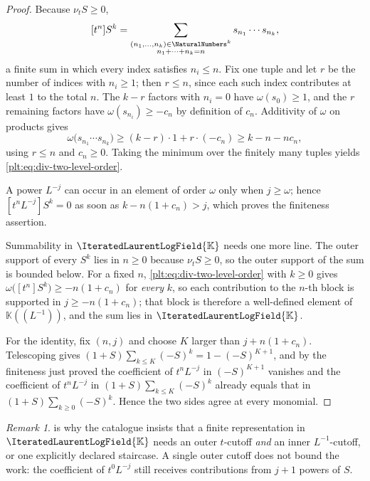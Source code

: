 \documentclass[11pt,oneside]{article}
\theoremstyle{plain}
\theoremstyle{definition}
\theoremstyle{remark}
\newtheorem{remark}[theorem]{Remark}
\newcommand{\K}{\mathbb{K}}
\newcommand{\PLit}{\IteratedLaurentLogField{\K}}         %
\newcommand{\ordt}{\nu_{t}}                              %
\begin{document}
\begin{proof}
Because \(\ordt S\ge0\),
\[
  [t^{n}]S^{k}=\sum_{\substack{(n_{1},\dots,n_{k})\in\NaturalNumbers^{k}\\
                               n_{1}+\cdots+n_{k}=n}}
    s_{n_{1}}\cdots s_{n_{k}},
\]
a finite sum in which every index satisfies \(n_{i}\le n\).  Fix one tuple and
let \(r\) be the number of indices with \(n_{i}\ge1\); then \(r\le n\), since
each such index contributes at least \(1\) to the total \(n\).  The \(k-r\)
factors with \(n_{i}=0\) have \(\omega(s_{0})\ge1\), and the \(r\) remaining
factors have \(\omega(s_{n_{i}})\ge-c_{n}\) by definition of \(c_{n}\).
Additivity of \(\omega\) on products gives
\[
  \omega\bigl(s_{n_{1}}\cdots s_{n_{k}}\bigr)
  \ge(k-r)\cdot1+r\cdot(-c_{n})
  \ge k-n-n c_{n},
\]
using \(r\le n\) and \(c_{n}\ge0\).  Taking the minimum over the finitely many
tuples yields \cref{plt:eq:div-two-level-order}.

A power \(L^{-j}\) can occur in an element of order \(\omega\) only when
\(j\ge\omega\); hence \([t^{n}L^{-j}]S^{k}=0\) as soon as
\(k-n(1+c_{n})>j\), which proves the finiteness assertion.

Summability in \(\PLit\) needs one more line.  The outer support of every
\(S^{k}\) lies in \(n\ge0\) because \(\ordt S\ge0\), so the outer support of
the sum is bounded below.  For a fixed \(n\),
\cref{plt:eq:div-two-level-order} with \(k\ge0\) gives
\(\omega\bigl([t^{n}]S^{k}\bigr)\ge-n(1+c_{n})\) for \emph{every} \(k\), so
each contribution to the \(n\)-th block is supported in \(j\ge-n(1+c_{n})\);
that block is therefore a well-defined element of \(\K((L^{-1}))\), and the
sum lies in \(\PLit\).

For the identity, fix \((n,j)\) and choose \(K\) larger than
\(j+n(1+c_{n})\).  Telescoping gives
\((1+S)\sum_{k\le K}(-S)^{k}=1-(-S)^{K+1}\), and by the finiteness just proved
the coefficient of \(t^{n}L^{-j}\) in \((-S)^{K+1}\) vanishes and the
coefficient of \(t^{n}L^{-j}\) in \((1+S)\sum_{k\le K}(-S)^{k}\) already equals
that in \((1+S)\sum_{k\ge0}(-S)^{k}\).  Hence the two sides agree at every
monomial.
\end{proof}

\begin{remark}
 is why the catalogue insists that a finite
representation in \(\PLit\) needs an outer \(t\)-cutoff \emph{and} an inner
\(L^{-1}\)-cutoff, or one explicitly declared staircase.  A single outer cutoff
does not bound the work: the coefficient of \(t^{0}L^{-j}\) still receives
contributions from \(j+1\) powers of \(S\).
\end{remark}
\end{document}
